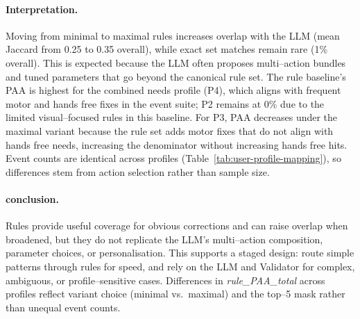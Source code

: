 \documentclass[openany]{book}
\begin{document}
\begin{table}[H]
\centering
\small %
\setlength{\tabcolsep}{3pt} %
\caption{Rule baseline vs.\ LLM by profile. Jaccard is set overlap of action names.}
\label{tab:rule-vs-llm-compact}
\end{table}

\paragraph{Interpretation.}
Moving from minimal to maximal rules increases overlap with the LLM (mean Jaccard from 0.25 to 0.35 overall), while exact set matches remain rare (1\% overall). This is expected because the LLM often proposes multi–action bundles and tuned parameters that go beyond the canonical rule set. The rule baseline’s PAA is highest for the combined needs profile (P4), which aligns with frequent motor and hands free fixes in the event suite; P2 remains at 0\% due to the limited visual–focused rules in this baseline. For P3, PAA decreases under the maximal variant because the rule set adds motor fixes that do not align with hands free needs, increasing the denominator without increasing hands free hits. Event counts are identical across profiles (Table~\ref{tab:user-profile-mapping}), so differences stem from action selection rather than sample size.

\paragraph{conclusion.}
Rules provide useful coverage for obvious corrections and can raise overlap when broadened, but they do not replicate the LLM’s multi–action composition, parameter choices, or personalisation. This supports a staged design: route simple patterns through rules for speed, and rely on the LLM and Validator for complex, ambiguous, or profile–sensitive cases. Differences in \emph{rule\_PAA\_total} across profiles reflect variant choice (minimal vs.\ maximal) and the top–5 mask rather than unequal event counts.
\end{document}
